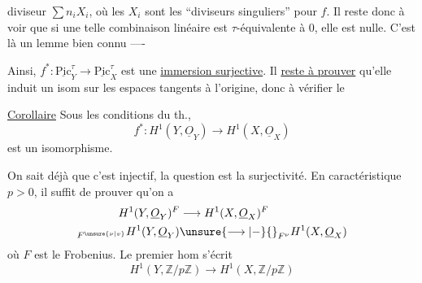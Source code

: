 diviseur $\sum n_i X_i$, où les $X_i$ sont les ``diviseurs
singuliers'' pour $f$. Il reste donc à voir que si
une telle combinaison linéaire est 
$\tau$-équivalente à $0$, elle est nulle.  C'est là
un lemme bien connu ----

Ainsi, $f^*:\underline{\mathrm{Pic}}^\tau_Y\to\underline{\mathrm{Pic}}^\tau_X$ est une \uline{immersion
surjective}. Il \uline{reste à prouver} qu'elle induit
un isom sur les espaces tangents à l'origine,
donc à vérifier le

\uline{Corollaire} Sous les conditions du th., 
\[
f^*:H^1(Y,\underline{O}_Y)\to H^1(X,\underline{O}_X)
\]
est un isomorphisme.

On sait déjà que c'est injectif, la question
est la surjectivité.  En caractéristique $p>0$,
il suffit de prouver qu'on a 
\[
\begin{aligned}
H^1(Y,\underline{O}_Y)^F&\longrightarrow H^1(X,\underline{O}_X)^F\\
{}_{F^{\unsure{\nu|v}}}H^1(Y,\underline{O}_Y)&\unsure{\longrightarrow|-}{}_{F^{\nu}}H^1(X,\underline{O}_X)
\end{aligned}
\]
où $F$ est le Frobenius. Le premier
hom s'écrit
\[
H^1(Y,\mathbb Z/p\mathbb Z)\to H^1(X,\mathbb Z/p\mathbb Z)
\]
